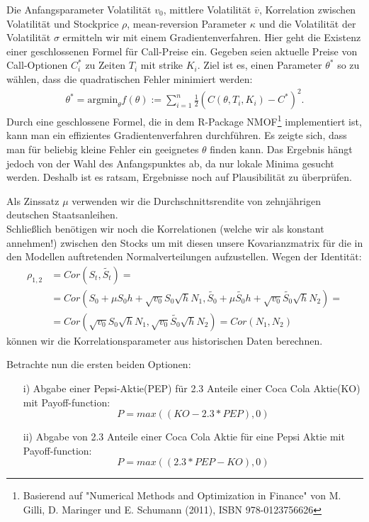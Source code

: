 \documentclass[12pt]{article}
\begin{document}
Die Anfangsparameter Volatilität $v_0$, mittlere Volatilität $\bar{v}$, Korrelation zwischen Volatilität und Stockprice $\rho$, mean-reversion Parameter $\kappa$ und die Volatilität der Volatilität $\sigma$ ermitteln wir mit einem Gradientenverfahren. Hier geht die Existenz einer geschlossenen Formel für Call-Preise ein. Gegeben seien aktuelle Preise von Call-Optionen $C_i^*$ zu Zeiten $T_i$ mit strike $K_i$. Ziel ist es, einen Parameter $\theta^*$ so zu wählen, dass die quadratischen Fehler minimiert werden:
\begin{gather*}
\theta^*=\text{argmin}_{\theta} f(\theta):=\sum_{i=1}^n \frac12 (C(\theta,T_i,K_i)-C^*)^2.
\end{gather*}
Durch eine geschlossene Formel, die in dem R-Package \glqq NMOF\grqq\footnote{Basierend auf "Numerical Methods and Optimization in Finance" von M. Gilli, D. Maringer und E. Schumann (2011), ISBN 978-0123756626} implementiert ist, kann man ein effizientes Gradientenverfahren durchführen. Es zeigte sich, dass man für beliebig kleine Fehler ein geeignetes $\theta$ finden kann. Das Ergebnis hängt jedoch von der Wahl des Anfangspunktes ab, da nur lokale Minima gesucht werden. Deshalb ist es ratsam, Ergebnisse noch auf Plausibilität zu überprüfen.


Als Zinssatz $\mu$ verwenden wir die Durchschnittsrendite von zehnjährigen deutschen Staatsanleihen.\\
Schließlich benötigen wir noch die Korrelationen (welche wir als konstant annehmen!) zwischen den Stocks um mit diesen unsere Kovarianzmatrix für die in den Modellen auftretenden Normalverteilungen aufzustellen.
Wegen der Identität:
\begin{align*}
\rho_{1,2}&=Cor(S_t,\tilde{S_t})=\\
&=Cor(S_0+\mu S_0h+\sqrt{v_0}S_0\sqrt{h}N_1,\tilde{S_0}+\mu \tilde{S_0}h+\sqrt{v_0}\tilde{S_0}\sqrt{h}N_2)= \\
&=Cor(\sqrt{v_0}S_0\sqrt{h}N_1,\sqrt{v_0}\tilde{S_0}\sqrt{h}N_2)=Cor(N_1,N_2)
\end{align*}
können wir die Korrelationsparameter aus historischen Daten berechnen.


Betrachte nun die ersten beiden Optionen:
\begin{itemize}
	\item[i)] Abgabe einer Pepsi-Aktie(PEP) für 2.3 Anteile einer Coca Cola Aktie(KO) mit Payoff-function:
	\begin{equation*}
	P=max((KO-2.3*PEP),0)
	\end{equation*}			
	\item[ii)] Abgabe von 2.3 Anteile einer Coca Cola Aktie für eine Pepsi Aktie mit Payoff-function:
	\begin{equation*}
	P=max((2.3*PEP-KO),0)
	\end{equation*}			
\end{itemize}
\end{document}
